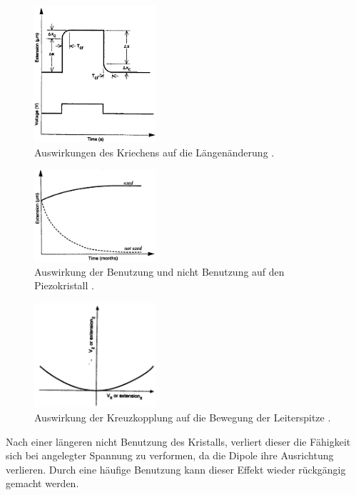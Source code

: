 \begin{figure}[!h]
    \centering
    \includegraphics[width=0.4\textwidth]{images/kriechen.JPG}
    \caption{Auswirkungen des Kriechens auf die Längenänderung \cite{STM-Literatur}.}
\end{figure}

\begin{figure}[!h]
    \centering
    \includegraphics[width=0.4\textwidth]{images/aging.JPG}
    \caption{Auswirkung der Benutzung und nicht Benutzung auf den Piezokristall \cite{STM-Literatur}.}
\end{figure}

\begin{figure}[!h]
    \centering
    \includegraphics[width=0.4\textwidth]{images/Kreuzkupplung.JPG}
    \caption{Auswirkung der Kreuzkopplung auf die Bewegung der Leiterspitze \cite{STM-Literatur}.}
\end{figure}

Nach einer längeren nicht Benutzung des Kristalls, verliert dieser die Fähigkeit sich bei angelegter Spannung zu verformen, da die Dipole ihre Ausrichtung verlieren.
Durch eine häufige Benutzung kann dieser Effekt wieder rückgängig gemacht werden.

